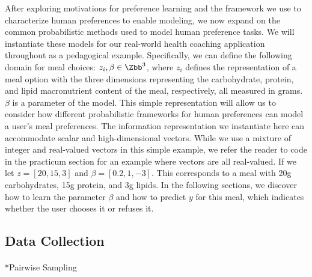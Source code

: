 \documentclass[
  letterpaper,
  DIV=11,
  numbers=noendperiod,
  oneside]{scrreprt}
\makeatletter
\let\oldparagraph\paragraph
\renewcommand{\paragraph}{
    \@ifstar
      \xxxParagraphStar
      \xxxParagraphNoStar
  }
\newcommand{\xxxParagraphStar}[1]{\oldparagraph*{#1}\mbox{}}
\newcommand{\xxxParagraphNoStar}[1]{\oldparagraph{#1}\mbox{}}
\theoremstyle{remark}
\makeatother
\begin{document}
After exploring motivations for preference learning and the framework we
use to characterize human preferences to enable modeling, we now expand
on the common probabilistic methods used to model human preference
tasks. We will instantiate these models for our real-world health
coaching application throughout as a pedagogical example. Specifically,
we can define the following domain for meal choices:
\(z_i, \beta \in \Zbb^3\), where \(z_i\) defines the representation of a
meal option with the three dimensions representing the carbohydrate,
protein, and lipid macronutrient content of the meal, respectively, all
measured in grams. \(\beta\) is a parameter of the model. This simple
representation will allow us to consider how different probabilistic
frameworks for human preferences can model a user's meal preferences.
The information representation we instantiate here can accommodate
scalar and high-dimensional vectors. While we use a mixture of integer
and real-valued vectors in this simple example, we refer the reader to
code in the practicum section for an example where vectors are all
real-valued. If we let \(z = [20, 15, 3]\) and \(\beta = [0.2, 1, -3]\).
This corresponds to a meal with 20g carbohydrates, 15g protein, and 3g
lipids. In the following sections, we discover how to learn the
parameter \(\beta\) and how to predict \(y\) for this meal, which
indicates whether the user chooses it or refuses it.

\subsection{Data Collection}\label{data-collection}

\paragraph*{Pairwise Sampling}\label{pairwise-sampling}
\end{document}
